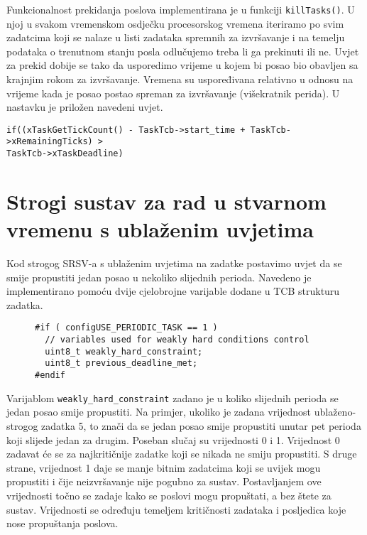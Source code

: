 \documentclass[../zavrsni.tex]{subfiles}
\begin{document}
Funkcionalnost prekidanja poslova implementirana je u funkciji \texttt{killTasks()}. U njoj u svakom vremenskom osdječku procesorskog
vremena iteriramo po svim zadatcima koji se 
nalaze u listi zadataka spremnih za izvršavanje i na temelju podataka o trenutnom stanju posla odlučujemo treba li ga prekinuti ili ne.
Uvjet za prekid dobije se tako da usporedimo vrijeme u kojem bi posao bio obavljen sa krajnjim rokom za izvršavanje. Vremena su uspoređivana
relativno u odnosu na vrijeme kada je posao postao spreman za izvršavanje (višekratnik perida).
U nastavku je priložen navedeni uvjet.
\begin{lstlisting}[style=CStyle,caption={Uvjet za prekidanje izvođenja zadatka},captionpos=b]
if((xTaskGetTickCount() - TaskTcb->start_time + TaskTcb->xRemainingTicks) > 
TaskTcb->xTaskDeadline)
\end{lstlisting}


\section{Strogi sustav za rad u stvarnom vremenu s ublaženim uvjetima}

Kod strogog SRSV-a s ublaženim uvjetima na zadatke postavimo uvjet da se smije propustiti jedan posao u nekoliko slijednih perioda.
Navedeno je implementirano pomoću dvije cjelobrojne varijable dodane u TCB strukturu zadatka.

\begin{figure}[h]
\centering
\begin{lstlisting}[style=CStyle,caption={Varijable dodane u strukturu za kontrolu zadataka},captionpos=b]
#if ( configUSE_PERIODIC_TASK == 1 )
  // variables used for weakly hard conditions control
  uint8_t weakly_hard_constraint;
  uint8_t previous_deadline_met;
#endif
\end{lstlisting}
\end{figure}

Varijablom \texttt{weakly\_hard\_constraint} zadano je u koliko slijednih perioda se jedan posao smije propustiti.
Na primjer, ukoliko je zadana vrijednost ublaženo-strogog zadatka 5, to znači da se jedan posao smije propustiti unutar pet perioda 
koji slijede jedan za drugim.
Poseban slučaj su vrijednosti 0 i 1. Vrijednost 0 zadavat će se za najkritičnije zadatke koji se nikada ne smiju propustiti.
S druge strane, vrijednost 1 daje se manje bitnim zadatcima koji se uvijek mogu propustiti i čije neizvršavanje nije pogubno za sustav.
Postavljanjem ove vrijednosti točno se zadaje kako se poslovi mogu propuštati, a bez štete za sustav. Vrijednosti se određuju 
temeljem kritičnosti zadataka i posljedica koje nose propuštanja poslova.
\end{document}
